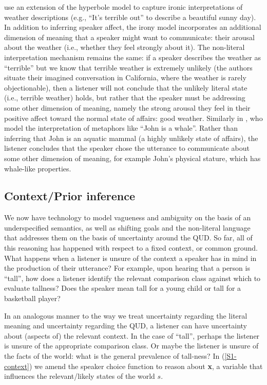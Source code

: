 \documentclass{sp}
\begin{document}
\cite{kaogoodman2015} use an extension of the hyperbole model to capture ironic interpretations of weather descriptions (e.g., ``It's terrible out'' to describe a beautiful sunny day). In addition to inferring speaker affect, the irony model incorporates an additional dimension of meaning that a speaker might want to communicate: their arousal about the weather (i.e., whether they feel strongly about it). The non-literal interpretation mechanism remains the same: if a speaker describes the weather as ``terrible'' but we know that terrible weather is extremely unlikely (the authors situate their imagined conversation in California, where the weather is rarely objectionable), then a listener will not conclude that the unlikely literal state (i.e., terrible weather) holds, but rather that the speaker must be addressing some other dimension of meaning, namely the strong arousal they feel in their positive affect toward the normal state of affairs: good weather. Similarly in \cite{kaoetal2014metaphor}, who model the interpretation of metaphors like ``John is a whale''. Rather than inferring that John is an aquatic mammal (a highly unlikely state of affairs), the listener concludes that the speaker chose the utterance to communicate about some other dimension of meaning, for example John's physical stature, which has whale-like properties.

\subsection{Context/Prior inference} \label{context-inference}

We now have technology to model vagueness and ambiguity on the basis of an underspecified semantics, as well as shifting goals and the non-literal language that addresses them on the basis of uncertainty around the QUD. So far, all of this reasoning has happened with respect to a fixed context, or common ground. What happens when a listener is unsure of the context a speaker has in mind in the production of their utterance? 
For example, upon hearing that a person is ``tall'', how does a listener identify the relevant comparison class against which to evaluate tallness? Does the speaker mean tall for a young child or tall for a basketball player?

In an analogous manner to the way we treat uncertainty regarding the literal meaning and uncertainty regarding the QUD, a listener can have uncertainty about (aspects of) the relevant context. In the case of ``tall'', perhaps the listener is unsure of the appropriate comparison class. Or maybe the listener is unsure of the facts of the world: what is the general prevalence of tall-ness? In (\ref{S1-context}) we amend the speaker choice function to reason about \textbf{x}, a variable that influences the relevant/likely states of the world $s$.
\end{document}

